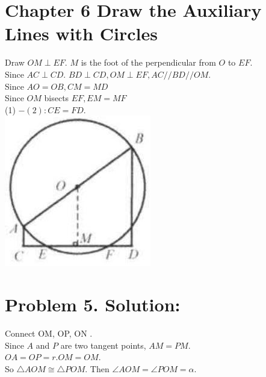 \documentclass[10pt]{article}
\begin{document}
\section*{Chapter 6 Draw the Auxiliary Lines with Circles}
Draw \(O M \perp E F\). \(M\) is the foot of the perpendicular from \(O\) to \(E F\).\\
Since \(A C \perp C D\). \(B D \perp C D, O M \perp E F, A C / / B D / / O M\).\\
Since \(A O=O B, C M=M D\)\\
Since \(O M\) bisects \(E F, E M=M F\)\\
(1) \(-(2): C E=F D\).\\
\includegraphics[max width=\textwidth, center]{2025_04_17_97bc1f7e44d93c271a88g-158}

\section*{Problem 5. Solution:}
Connect OM, OP, ON .\\
Since \(A\) and \(P\) are two tangent points, \(A M=P M\).\\
\(O A=O P=r . O M=O M\).\\
So \(\triangle A O M \cong \triangle P O M\). Then \(\angle A O M=\angle P O M=\alpha\).
\end{document}
